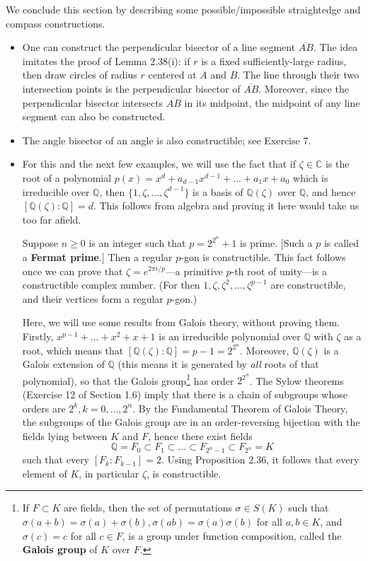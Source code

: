 \documentclass[leqno]{book}
\begin{document}
\noindent We conclude this section by describing some possible/impossible straightedge and compass constructions.
\begin{itemize}
\item One can construct the perpendicular bisector of a line segment $\overline{AB}$.  The idea imitates the proof of Lemma 2.38(i): if $r$ is a fixed sufficiently-large radius, then draw circles of radius $r$ centered at $A$ and $B$.  The line through their two intersection points is the perpendicular bisector of $\overline{AB}$.  Moreover, since the perpendicular bisector intersects $\overline{AB}$ in its midpoint, the midpoint of any line segment can also be constructed.

\item The angle bisector of an angle is also constructible; see Exercise 7.

\item For this and the next few examples, we will use the fact that if $\zeta\in\mathbb C$ is the root of a polynomial $p(x)=x^d+a_{d-1}x^{d-1}+\dots+a_1x+a_0$ which is irreducible over $\mathbb Q$, then $\{1,\zeta,\dots,\zeta^{d-1}\}$ is a basis of $\mathbb Q(\zeta)$ over $\mathbb Q$, and hence $[\mathbb Q(\zeta):\mathbb Q]=d$.  This follows from algebra and proving it here would take us too far afield.

 Suppose $n\geqslant 0$ is an integer such that $p=2^{2^n}+1$ is prime.  [Such a $p$ is called a \textbf{Fermat prime}.]  Then a regular $p$-gon is constructible.  This fact follows once we can prove that $\zeta=e^{2\pi i/p}$\----a primitive $p$-th root of unity\----is a constructible complex number.  (For then $1,\zeta,\zeta^2,\dots,\zeta^{p-1}$ are constructible, and their vertices form a regular $p$-gon.)

Here, we will use some results from Galois theory, without proving them.  Firstly, $x^{p-1}+\dots+x^2+x+1$ is an irreducible polynomial over $\mathbb Q$ with $\zeta$ as a root, which means that $[\mathbb Q(\zeta):\mathbb Q]=p-1=2^{2^n}$.  Moreover, $\mathbb Q(\zeta)$ is a Galois extension of $\mathbb Q$ (this means it is generated by \emph{all} roots of that polynomial), so that the Galois group\footnote{If $F\subset K$ are fields, then the set of permutations $\sigma\in S(K)$ such that $\sigma(a+b)=\sigma(a)+\sigma(b),\sigma(ab)=\sigma(a)\sigma(b)$ for all $a,b\in K$, and $\sigma(c)=c$ for all $c\in F$, is a group under function composition, called the \textbf{Galois group} of $K$ over $F$.} has order $2^{2^n}$.  The Sylow theorems (Exercise 12 of Section 1.6) imply that there is a chain of subgroups whose orders are $2^k,k=0,\dots,2^n$.  By the Fundamental Theorem of Galois Theory, the subgroups of the Galois group are in an order-reversing bijection with the fields lying between $K$ and $F$, hence there exist fields
$$\mathbb Q=F_0\subset F_1\subset\dots\subset F_{2^n-1}\subset F_{2^n}=K$$
such that every $[F_k:F_{k-1}]=2$.  Using Proposition 2.36, it follows that every element of $K$, in particular $\zeta$, is constructible.


\end{itemize}
\end{document}
